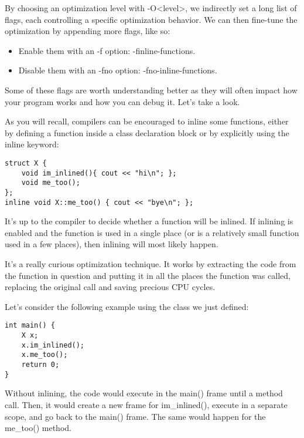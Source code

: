 By choosing an optimization level with -O<level>, we indirectly set a long list of flags, each controlling a specific optimization behavior. We can then fine-tune the optimization by appending more flags, like so:

\begin{itemize}
\item 
Enable them with an -f option: -finline-functions.
	
\item 
Disable them with an -fno option: -fno-inline-functions.
\end{itemize}

Some of these flags are worth understanding better as they will often impact how your program works and how you can debug it. Let's take a look.


As you will recall, compilers can be encouraged to inline some functions, either by defining a function inside a class declaration block or by explicitly using the inline keyword:

\begin{lstlisting}[style=styleCXX]
struct X {
	void im_inlined(){ cout << "hi\n"; };
	void me_too();
};
inline void X::me_too() { cout << "bye\n"; };
\end{lstlisting} 

It's up to the compiler to decide whether a function will be inlined. If inlining is enabled and the function is used in a single place (or is a relatively small function used in a few places), then inlining will most likely happen.

It's a really curious optimization technique. It works by extracting the code from the function in question and putting it in all the places the function was called, replacing the original call and saving precious CPU cycles.

Let's consider the following example using the class we just defined:

\begin{lstlisting}[style=styleCXX]
int main() {
	X x;
	x.im_inlined();
	x.me_too();
	return 0;
}
\end{lstlisting} 

Without inlining, the code would execute in the main() frame until a method call. Then, it would create a new frame for im\_inlined(), execute in a separate scope, and go back to the main() frame. The same would happen for the me\_too() method.

